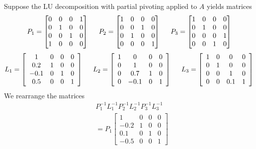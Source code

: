 \begin{example}
Suppose the LU decomposition with partial pivoting applied to $A$ yields matrices
$$
P_1 = \begin{bmatrix} 0 & 0 & 0 & 1 \\ 0 & 1 & 0 & 0 \\ 0 & 0 & 1 & 0 \\ 1 & 0 & 0 & 0 \end{bmatrix}
\hspace{5mm}
P_2 = \begin{bmatrix} 1 & 0 & 0 & 0 \\ 0 & 0 & 1 & 0 \\ 0 & 1 & 0 & 0 \\ 0 & 0 & 0 & 1 \end{bmatrix}
\hspace{5mm}
P_3 = \begin{bmatrix} 1 & 0 & 0 & 0 \\ 0 & 1 & 0 & 0 \\ 0 & 0 & 0 & 1 \\ 0 & 0 & 1 & 0 \end{bmatrix}
$$
$$
L_1 = \left[ \begin{array}{cccc} 1 & 0 & 0 & 0 \\ 0.2 & 1 & 0 & 0 \\ -0.1 & 0 & 1 & 0 \\ 0.5 & 0 & 0 & 1 \end{array} \right]
\hspace{5mm}
L_2 = \left[ \begin{array}{cccc} 1 & 0 & 0 & 0 \\ 0 & 1 & 0 & 0 \\ 0 & 0.7 & 1 & 0 \\ 0 & -0.1 & 0 & 1 \end{array} \right]
\hspace{5mm}
L_3 = \left[ \begin{array}{cccc} 1 & 0 & 0 & 0 \\ 0 & 1 & 0 & 0 \\ 0 & 0 & 1 & 0 \\ 0 & 0 & 0.1 & 1 \end{array} \right]
$$
We rearrange the matrices
\begin{align*}
& P_1^{-1} L_1^{-1} P_2^{-1} L_2^{-1} P_3^{-1} L_3^{-1} \\
&=
P_1
\left[ \begin{array}{cccc} 1 & 0 & 0 & 0 \\ -0.2 & 1 & 0 & 0 \\ 0.1 & 0 & 1 & 0 \\ -0.5 & 0 & 0 & 1 \end{array} \right]

\end{align*}
\end{example}
